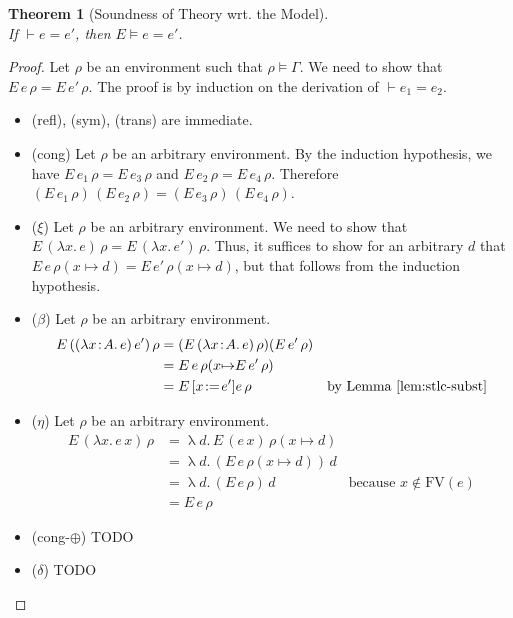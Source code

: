 \documentclass{tufte-handout}
\newcommand{\LAM}[1]{\lambda #1.\,}
\newcommand{\APP}[0]{\,}
\newcommand{\of}[0]{\!:\!}
\newcommand{\by}[0]{\!:=\!}
\newcommand{\ext}[3]{#3(#1{\mapsto}#2)}
\newtheorem{theorem}{Theorem}%
\begin{document}
\begin{theorem}[Soundness of Theory wrt. the Model]\ \\
  \noindent \label{thm:sound-E}
  If $\vdash e = e'$, then $E \models e = e'$.
\end{theorem}
\begin{proof}
  Let $\rho$ be an environment such that $\rho \models \Gamma$.
  We need to show that $E\,e\,\rho = E\,e'\,\rho$.
  The proof is by induction on the derivation of $\vdash e_1 = e_2$.
  \begin{itemize}
  \item (refl), (sym), (trans) are immediate.
  \item (cong)
    Let $\rho$ be an arbitrary environment.
    By the induction hypothesis, we have $E\,e_1\,\rho = E\,e_3\,\rho$
    and $E\,e_2\,\rho = E\,e_4\,\rho$. Therefore
    $(E\,e_1\,\rho)\APP(E\,e_2\,\rho) = (E\,e_3\,\rho) \APP (E\,e_4\,\rho)$.
    
  \item ($\xi$) Let $\rho$ be an arbitrary environment.  We need to
    show that $E\,(\LAM{x}e)\,\rho = E\,(\LAM{x}e')\,\rho$. Thus, it
    suffices to show for an arbitrary $d$ that
    $E\, e\, \ext{x}{d}{\rho} = E\, e'\, \ext{x}{d}{\rho}$,
    but that follows from the induction hypothesis.
    
  \item ($\beta$) Let $\rho$ be an arbitrary environment.
    \begin{align*}
      E\,((\LAM{x\of A}e)\APP e')\,\rho &=
      (E\,(\LAM{x\of A}e)\,\rho) (E\,e'\,\rho) \\
      &= E\,e\,\ext{x}{E\,e'\,\rho}{\rho} \\
      &= E\,[x\by e']e\,\rho  & \text{by Lemma~\ref{lem:stlc-subst}}
    \end{align*}
    
  \item ($\eta$) Let $\rho$ be an arbitrary environment.
    \begin{align*}
      E\,(\LAM{x} e \APP x)\,\rho &=
      \uplambda d.\,E\,(e \APP x)\,\ext{x}{d}{\rho} \\
      &= \uplambda d.\,(E\,e\,\ext{x}{d}{\rho}) \APP d \\
      &= \uplambda d.\,(E\,e\,\rho) \APP d & \text{because } x \notin \mathrm{FV}(e)\\
      &= E\,e\,\rho
    \end{align*}

  \item (cong-$\oplus$) TODO

  \item ($\delta$) TODO

  \end{itemize}
\end{proof}
\end{document}
